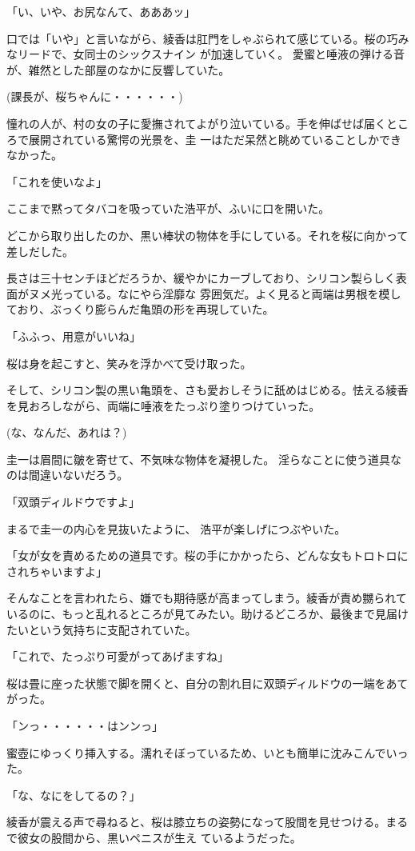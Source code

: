 ﻿\documentclass[book,tate]{jlreq}
\begin{document}
「い、いや、お尻なんて、あああッ」

口では「いや」と言いながら、綾香は肛門をしゃぶられて感じている。桜の巧みなリードで、女同士のシックスナイン が加速していく。 愛蜜と唾液の弾ける音が、雑然とした部屋のなかに反響していた。

(課長が、桜ちゃんに・・・・・・)

憧れの人が、村の女の子に愛撫されてよがり泣いている。手を伸ばせば届くところで展開されている驚愕の光景を、圭 一はただ呆然と眺めていることしかできなかった。

「これを使いなよ」

ここまで黙ってタバコを吸っていた浩平が、ふいに口を開いた。

どこから取り出したのか、黒い棒状の物体を手にしている。それを桜に向かって差しだした。

長さは三十センチほどだろうか、緩やかにカーブしており、シリコン製らしく表面がヌメ光っている。なにやら淫靡な 雰囲気だ。よく見ると両端は男根を模しており、ぶっくり膨らんだ亀頭の形を再現していた。

「ふふっ、用意がいいね」

桜は身を起こすと、笑みを浮かべて受け取った。

そして、シリコン製の黒い亀頭を、さも愛おしそうに舐めはじめる。怯える綾香を見おろしながら、両端に唾液をたっぷり塗りつけていった。

(な、なんだ、あれは？)

圭一は眉間に皺を寄せて、不気味な物体を凝視した。 淫らなことに使う道具なのは間違いないだろう。

「双頭ディルドウですよ」

まるで圭一の内心を見抜いたように、 浩平が楽しげにつぶやいた。

「女が女を責めるための道具です。桜の手にかかったら、どんな女もトロトロにされちゃいますよ」

そんなことを言われたら、嫌でも期待感が高まってしまう。綾香が責め嬲られているのに、もっと乱れるところが見てみたい。助けるどころか、最後まで見届けたいという気持ちに支配されていた。

「これで、たっぷり可愛がってあげますね」

桜は畳に座った状態で脚を開くと、自分の割れ目に双頭ディルドウの一端をあてがった。

「ンっ・・・・・・はンンっ」

蜜壺にゆっくり挿入する。濡れそぼっているため、いとも簡単に沈みこんでいった。

「な、なにをしてるの？」

綾香が震える声で尋ねると、桜は膝立ちの姿勢になって股間を見せつける。まるで彼女の股間から、黒いペニスが生え ているようだった。
\end{document}
